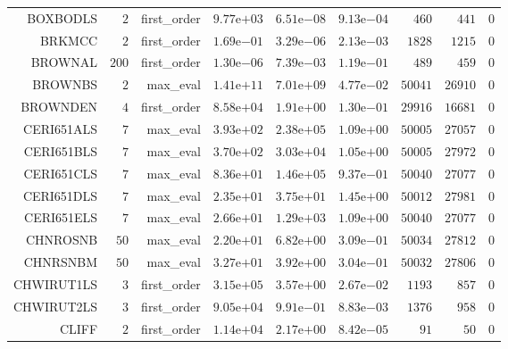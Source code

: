 \begin{longtable}{rrrrrrrrr}
BOXBODLS & \(     2\) & first\_order & \( 9.77\)e\(+03\) & \( 6.51\)e\(-08\) & \( 9.13\)e\(-04\) & \(   460\) & \(   441\) & \(     0\) \\
BRKMCC & \(     2\) & first\_order & \( 1.69\)e\(-01\) & \( 3.29\)e\(-06\) & \( 2.13\)e\(-03\) & \(  1828\) & \(  1215\) & \(     0\) \\
BROWNAL & \(   200\) & first\_order & \( 1.30\)e\(-06\) & \( 7.39\)e\(-03\) & \( 1.19\)e\(-01\) & \(   489\) & \(   459\) & \(     0\) \\
BROWNBS & \(     2\) & max\_eval & \( 1.41\)e\(+11\) & \( 7.01\)e\(+09\) & \( 4.77\)e\(-02\) & \( 50041\) & \( 26910\) & \(     0\) \\
BROWNDEN & \(     4\) & first\_order & \( 8.58\)e\(+04\) & \( 1.91\)e\(+00\) & \( 1.30\)e\(-01\) & \( 29916\) & \( 16681\) & \(     0\) \\
CERI651ALS & \(     7\) & max\_eval & \( 3.93\)e\(+02\) & \( 2.38\)e\(+05\) & \( 1.09\)e\(+00\) & \( 50005\) & \( 27057\) & \(     0\) \\
CERI651BLS & \(     7\) & max\_eval & \( 3.70\)e\(+02\) & \( 3.03\)e\(+04\) & \( 1.05\)e\(+00\) & \( 50005\) & \( 27972\) & \(     0\) \\
CERI651CLS & \(     7\) & max\_eval & \( 8.36\)e\(+01\) & \( 1.46\)e\(+05\) & \( 9.37\)e\(-01\) & \( 50040\) & \( 27077\) & \(     0\) \\
CERI651DLS & \(     7\) & max\_eval & \( 2.35\)e\(+01\) & \( 3.75\)e\(+01\) & \( 1.45\)e\(+00\) & \( 50012\) & \( 27981\) & \(     0\) \\
CERI651ELS & \(     7\) & max\_eval & \( 2.66\)e\(+01\) & \( 1.29\)e\(+03\) & \( 1.09\)e\(+00\) & \( 50040\) & \( 27077\) & \(     0\) \\
CHNROSNB & \(    50\) & max\_eval & \( 2.20\)e\(+01\) & \( 6.82\)e\(+00\) & \( 3.09\)e\(-01\) & \( 50034\) & \( 27812\) & \(     0\) \\
CHNRSNBM & \(    50\) & max\_eval & \( 3.27\)e\(+01\) & \( 3.92\)e\(+00\) & \( 3.04\)e\(-01\) & \( 50032\) & \( 27806\) & \(     0\) \\
CHWIRUT1LS & \(     3\) & first\_order & \( 3.15\)e\(+05\) & \( 3.57\)e\(+00\) & \( 2.67\)e\(-02\) & \(  1193\) & \(   857\) & \(     0\) \\
CHWIRUT2LS & \(     3\) & first\_order & \( 9.05\)e\(+04\) & \( 9.91\)e\(-01\) & \( 8.83\)e\(-03\) & \(  1376\) & \(   958\) & \(     0\) \\
CLIFF & \(     2\) & first\_order & \( 1.14\)e\(+04\) & \( 2.17\)e\(+00\) & \( 8.42\)e\(-05\) & \(    91\) & \(    50\) & \(     0\) \\

\end{longtable}
